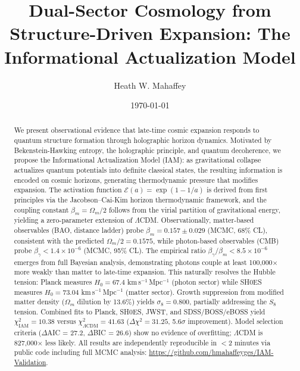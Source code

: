 \documentclass[twocolumn,superscriptaddress,prl,amsmath,amssymb]{revtex4-2}
\begin{document}
\title{Dual-Sector Cosmology from Structure-Driven Expansion: The Informational Actualization Model}

\author{Heath W. Mahaffey}

\date{\today}

\begin{abstract}
We present observational evidence that late-time cosmic expansion responds to quantum structure formation through holographic horizon dynamics. Motivated by Bekenstein-Hawking entropy, the holographic principle, and quantum decoherence, we propose the Informational Actualization Model (IAM): as gravitational collapse actualizes quantum potentials into definite classical states, the resulting information is encoded on cosmic horizons, generating thermodynamic pressure that modifies expansion. The activation function $\mathcal{E}(a) = \exp(1-1/a)$ is derived from first principles via the Jacobson--Cai-Kim horizon thermodynamic framework, and the coupling constant $\beta_m = \Omega_m/2$ follows from the virial partition of gravitational energy, yielding a zero-parameter extension of $\Lambda$CDM. Observationally, matter-based observables (BAO, distance ladder) probe $\beta_m = 0.157 \pm 0.029$ (MCMC, 68\% CL), consistent with the predicted $\Omega_m/2 = 0.1575$, while photon-based observables (CMB) probe $\beta_\gamma < 1.4 \times 10^{-6}$ (MCMC, 95\% CL). The empirical ratio $\beta_\gamma/\beta_m < 8.5 \times 10^{-6}$ emerges from full Bayesian analysis, demonstrating photons couple at least 100,000$\times$ more weakly than matter to late-time expansion. This naturally resolves the Hubble tension: Planck measures $H_0 = 67.4$ km\,s$^{-1}$\,Mpc$^{-1}$ (photon sector) while SH0ES measures $H_0 = 73.04$ km\,s$^{-1}$\,Mpc$^{-1}$ (matter sector). Growth suppression from modified matter density ($\Omega_m$ dilution by 13.6\%) yields $\sigma_8 = 0.800$, partially addressing the $S_8$ tension. Combined fits to Planck, SH0ES, JWST, and SDSS/BOSS/eBOSS yield $\chi^2_{\text{IAM}} = 10.38$ versus $\chi^2_{\Lambda\text{CDM}} = 41.63$ ($\Delta\chi^2 = 31.25$, 5.6$\sigma$ improvement). Model selection criteria ($\Delta$AIC = 27.2, $\Delta$BIC = 26.6) show no evidence of overfitting; $\Lambda$CDM is 827,000$\times$ less likely. All results are independently reproducible in $<$2 minutes via public code including full MCMC analysis: \url{https://github.com/hmahaffeyges/IAM-Validation}.
\end{abstract}
\end{document}
